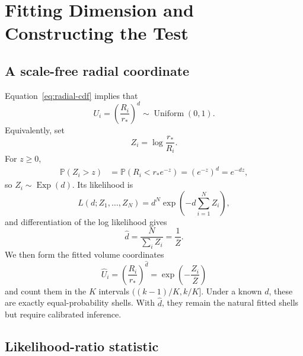\documentclass[11pt]{article}
\newcommand{\Prb}{\mathbb{P}}
\begin{document}
\section{Fitting Dimension and Constructing the Test}

\subsection{A scale-free radial coordinate}

Equation~\eqref{eq:radial-cdf} implies that
\begin{equation}
  U_i=\left(\frac{R_i}{r_\ast}\right)^d
  \sim\operatorname{Uniform}(0,1).
  \label{eq:volume-coordinate}
\end{equation}
Equivalently, set
\begin{equation}
  Z_i=\log\frac{r_\ast}{R_i}.
  \label{eq:log-radius}
\end{equation}
For $z\ge0$,
\begin{align}
  \Prb(Z_i>z)
  &=\Prb(R_i<r_\ast e^{-z})
    =\left(e^{-z}\right)^d=e^{-dz},
\end{align}
so $Z_i\sim\operatorname{Exp}(d)$. Its likelihood is
\begin{equation}
  L(d;Z_1,\ldots,Z_N)=d^N\exp\left(-d\sum_{i=1}^{N}Z_i\right),
\end{equation}
and differentiation of the log likelihood gives
\begin{equation}
  \widehat d=\frac{N}{\sum_i Z_i}=\frac{1}{\overline Z}.
  \label{eq:dimension-mle}
\end{equation}
We then form the fitted volume coordinates
\begin{equation}
  \widehat U_i
  =\left(\frac{R_i}{r_\ast}\right)^{\widehat d}
  =\exp\left(-\frac{Z_i}{\overline Z}\right)
  \label{eq:fitted-volume-coordinate}
\end{equation}
and count them in the $K$ intervals
$((k-1)/K,k/K]$. Under a known $d$, these are exactly equal-probability shells.
With $\widehat d$, they remain the natural fitted shells but require calibrated
inference.

\subsection{Likelihood-ratio statistic}
\end{document}
